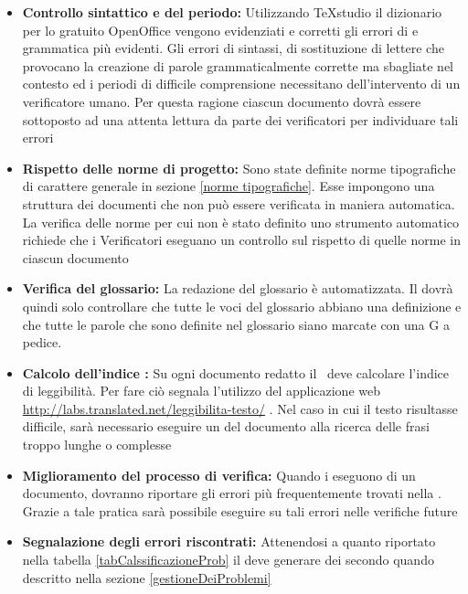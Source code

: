 \documentclass[12pt,a4paper]{article}
\begin{document}
\begin{itemize}
	\item \textbf{Controllo sintattico e del periodo:} Utilizzando TeXstudio il dizionario per lo  gratuito OpenOffice vengono evidenziati e corretti gli errori di  e grammatica più evidenti. Gli errori di sintassi, di sostituzione di lettere che provocano la creazione di parole grammaticalmente corrette ma sbagliate nel contesto ed i periodi di difficile comprensione necessitano dell'intervento di un verificatore umano. Per questa ragione ciascun documento dovrà essere sottoposto ad una attenta lettura da parte dei verificatori per individuare tali errori
	\item \textbf{Rispetto delle norme di progetto:} Sono state definite norme tipografiche di carattere generale in \NdP{} sezione \ref{norme tipografiche}. Esse impongono una struttura dei documenti che non può essere verificata in maniera automatica. La verifica delle norme per cui non è stato definito uno strumento automatico richiede che i Verificatori eseguano un controllo sul rispetto di quelle norme in ciascun documento
	\item \textbf{Verifica del glossario:} La redazione del glossario è automatizzata. Il \VR{} dovrà quindi solo controllare che tutte le voci del glossario abbiano una definizione e che tutte le parole che sono definite nel glossario siano marcate con una G a pedice.
	\item \textbf{Calcolo dell’indice :} Su ogni documento redatto il \VR\ deve calcolare l’indice di leggibilità. Per fare ciò segnala l'utilizzo del applicazione web \url{http://labs.translated.net/leggibilita-testo/} . Nel caso in cui il testo risultasse difficile, sarà necessario eseguire un  del documento alla ricerca delle frasi troppo lunghe o complesse
	\item \textbf{Miglioramento del processo di verifica:} Quando i \VRpl{} eseguono  di un documento, dovranno riportare gli errori più frequentemente trovati nella . Grazie a tale pratica sarà possibile eseguire  su tali errori nelle verifiche future
	\item \textbf{Segnalazione degli errori riscontrati:} Attenendosi a quanto riportato nella tabella \ref{tabCalssificazioneProb} il \VR{} deve generare dei  secondo quando descritto nella sezione \ref{gestioneDeiProblemi}
\end{itemize}
\end{document}
